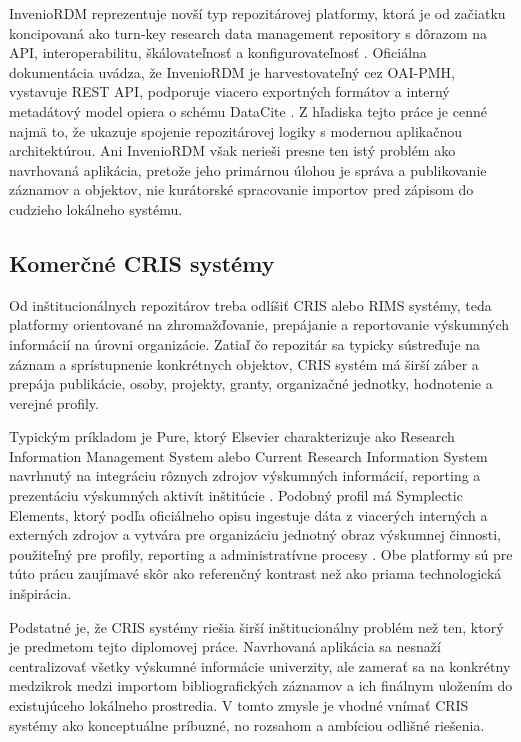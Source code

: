InvenioRDM reprezentuje novší typ repozitárovej platformy, ktorá je od začiatku koncipovaná ako turn-key research data management repository s dôrazom na API, interoperabilitu, škálovateľnosť a konfigurovateľnosť \cite{InvenioRDMDocs}. Oficiálna dokumentácia uvádza, že InvenioRDM je harvestovateľný cez OAI-PMH, vystavuje REST API, podporuje viacero exportných formátov a interný metadátový model opiera o schému DataCite \cite{InvenioRDMInteroperable}. Z hľadiska tejto práce je cenné najmä to, že ukazuje spojenie repozitárovej logiky s modernou aplikačnou architektúrou. Ani InvenioRDM však nerieši presne ten istý problém ako navrhovaná aplikácia, pretože jeho primárnou úlohou je správa a publikovanie záznamov a objektov, nie kurátorské spracovanie importov pred zápisom do cudzieho lokálneho systému.

\subsection{Komerčné CRIS systémy}

Od inštitucionálnych repozitárov treba odlíšiť CRIS alebo RIMS systémy, teda platformy orientované na zhromažďovanie, prepájanie a reportovanie výskumných informácií na úrovni organizácie. Zatiaľ čo repozitár sa typicky sústreďuje na záznam a sprístupnenie konkrétnych objektov, CRIS systém má širší záber a prepája publikácie, osoby, projekty, granty, organizačné jednotky, hodnotenie a verejné profily.

Typickým príkladom je Pure, ktorý Elsevier charakterizuje ako Research Information Management System alebo Current Research Information System navrhnutý na integráciu rôznych zdrojov výskumných informácií, reporting a prezentáciu výskumných aktivít inštitúcie \cite{PureRIMS}. Podobný profil má Symplectic Elements, ktorý podľa oficiálneho opisu ingestuje dáta z viacerých interných a externých zdrojov a vytvára pre organizáciu jednotný obraz výskumnej činnosti, použiteľný pre profily, reporting a administratívne procesy \cite{SymplecticElements}. Obe platformy sú pre túto prácu zaujímavé skôr ako referenčný kontrast než ako priama technologická inšpirácia.

Podstatné je, že CRIS systémy riešia širší inštitucionálny problém než ten, ktorý je predmetom tejto diplomovej práce. Navrhovaná aplikácia sa nesnaží centralizovať všetky výskumné informácie univerzity, ale zamerať sa na konkrétny medzikrok medzi importom bibliografických záznamov a ich finálnym uložením do existujúceho lokálneho prostredia. V tomto zmysle je vhodné vnímať CRIS systémy ako konceptuálne príbuzné, no rozsahom a ambíciou odlišné riešenia.

